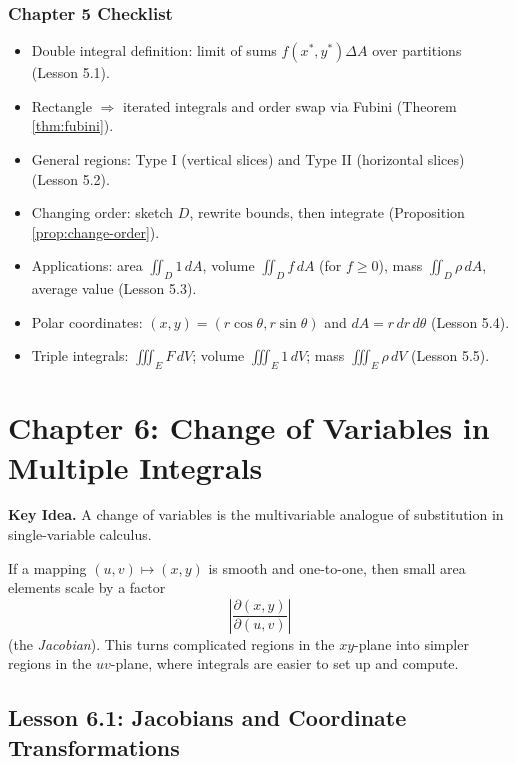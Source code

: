 \documentclass[12pt]{article}
\numberwithin{equation}{section}
\theoremstyle{plain}
\theoremstyle{definition}
\theoremstyle{remark}
\newenvironment{keyidea}{\begin{tcolorbox}\textbf{Key Idea.}}{\end{tcolorbox}}
\begin{document}
\subsubsection*{Chapter 5 Checklist}
\begin{itemize}
\item Double integral definition: limit of sums $f(x^*,y^*)\Delta A$ over partitions (Lesson 5.1).
\item Rectangle $\Rightarrow$ iterated integrals and order swap via Fubini (Theorem \cref{thm:fubini}).
\item General regions: Type I (vertical slices) and Type II (horizontal slices) (Lesson 5.2).
\item Changing order: sketch $D$, rewrite bounds, then integrate (Proposition \cref{prop:change-order}).
\item Applications: area $\iint_D 1\,dA$, volume $\iint_D f\,dA$ (for $f\ge0$), mass $\iint_D \rho\,dA$, average value (Lesson 5.3).
\item Polar coordinates: $(x,y)=(r\cos\theta,r\sin\theta)$ and $dA=r\,dr\,d\theta$ (Lesson 5.4).
\item Triple integrals: $\iiint_E F\,dV$; volume $\iiint_E 1\,dV$; mass $\iiint_E \rho\,dV$ (Lesson 5.5).
\end{itemize}



\section{Chapter 6: Change of Variables in Multiple Integrals}

\begin{keyidea}
A change of variables is the multivariable analogue of substitution in single-variable calculus.

If a mapping $(u,v)\mapsto (x,y)$ is smooth and one-to-one, then small area elements scale by a factor
\[
\left|\frac{\partial(x,y)}{\partial(u,v)}\right|
\]
(the \emph{Jacobian}). This turns complicated regions in the $xy$-plane into simpler regions in the $uv$-plane, where integrals are easier to set up and compute.
\end{keyidea}

\subsection{Lesson 6.1: Jacobians and Coordinate Transformations}
\end{document}
